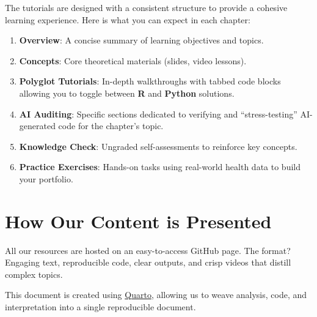 \documentclass[
  letterpaper,
  DIV=11,
  numbers=noendperiod,
  oneside]{scrreprt}
\providecommand{\tightlist}{%
  \setlength{\itemsep}{0pt}\setlength{\parskip}{0pt}}
\begin{document}
\begin{tcolorbox}[enhanced jigsaw, opacitybacktitle=0.6, colbacktitle=quarto-callout-note-color!10!white, breakable, opacityback=0, coltitle=black, toptitle=1mm, bottomrule=.15mm, colframe=quarto-callout-note-color-frame, bottomtitle=1mm, colback=white, leftrule=.75mm, rightrule=.15mm, title=\textcolor{quarto-callout-note-color}{\faInfo}\hspace{0.5em}{Note}, left=2mm, arc=.35mm, toprule=.15mm, titlerule=0mm]

The tutorials are designed with a consistent structure to provide a
cohesive learning experience. Here is what you can expect in each
chapter:

\begin{enumerate}
\def\labelenumi{\arabic{enumi}.}
\tightlist
\item
  \textbf{Overview}: A concise summary of learning objectives and
  topics.
\item
  \textbf{Concepts}: Core theoretical materials (slides, video lessons).
\item
  \textbf{Polyglot Tutorials}: In-depth walkthroughs with tabbed code
  blocks allowing you to toggle between \textbf{R} and \textbf{Python}
  solutions.
\item
  \textbf{AI Auditing}: Specific sections dedicated to verifying and
  ``stress-testing'' AI-generated code for the chapter's topic.
\item
  \textbf{Knowledge Check}: Ungraded self-assessments to reinforce key
  concepts.
\item
  \textbf{Practice Exercises}: Hands-on tasks using real-world health
  data to build your portfolio.
\end{enumerate}

\end{tcolorbox}

\section*{How Our Content is
Presented}\label{how-our-content-is-presented}


All our resources are hosted on an easy-to-access GitHub page. The
format? Engaging text, reproducible code, clear outputs, and crisp
videos that distill complex topics.

This document is created using \href{https://quarto.org/}{Quarto},
allowing us to weave analysis, code, and interpretation into a single
reproducible document.
\end{document}
